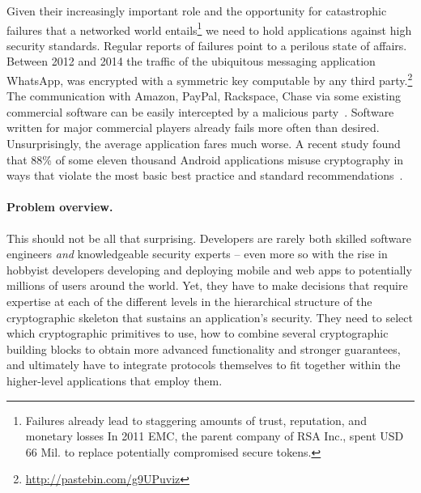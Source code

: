 \documentclass[10pt]{article}
\begin{document}
Given their increasingly important role and the opportunity for catastrophic failures that a
networked world entails\footnote{
Failures already lead to staggering amounts of trust, reputation, and monetary losses In 2011 EMC,
the parent company of RSA Inc., spent USD 66 Mil. to replace potentially compromised secure tokens.
} we need to hold applications against high security standards.
Regular reports of failures point to a perilous state of affairs. 
Between 2012 and 2014 the traffic of the ubiquitous messaging application \textsf{WhatsApp},
was encrypted with a symmetric key computable by any third
party.\footnote{\url{http://pastebin.com/g9UPuviz}}
The communication with \textsf{Amazon, PayPal, Rackspace, Chase} via some existing commercial
software can be easily intercepted by a malicious party~\cite{GIJABS12}.
Software written for major commercial players already fails more often than desired.  Unsurprisingly, the average
application fares much worse. 
A recent study found that 88\% of some eleven thousand Android applications misuse cryptography in
ways that violate the most basic best practice and standard
recommendations~\cite{egele13anempirical}.

\paragraph*{Problem overview.}

This should not be all that surprising.   Developers are rarely both skilled software engineers \emph{and} knowledgeable security experts -- even more so with the rise in hobbyist developers developing and deploying mobile and web apps to potentially millions of users around the world. 
Yet, they have to make decisions that require expertise at each of the different levels in the hierarchical structure of the cryptographic skeleton that sustains an application's security.
They need to select which cryptographic primitives to use, how to combine several cryptographic building blocks to obtain more advanced functionality and stronger guarantees, and ultimately have to integrate protocols themselves to fit together within the higher-level applications that employ them.
\end{document}
